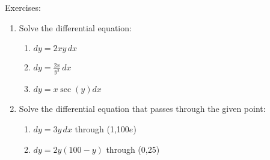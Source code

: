 \documentclass[../revisedmain.tex]{subfiles}
\begin{document}
\begin{center}
	\LARGE Exercises:
\end{center}
\begin{enumerate}
	\item Solve the differential equation:
	\begin{enumerate}
		\item $dy=2xy\,dx$
		\item $dy=\frac{2x}{y^2}\,dx$
		\item $dy=x\sec(y)dx$
	\end{enumerate}
	\item Solve the differential equation that passes through the given point:
	\begin{enumerate}
		\item $dy=3y\,dx$ through (1,100$e$)
		\item $dy=2y(100-y)$ through (0,25)
	\end{enumerate}
\end{enumerate}
\end{document}
